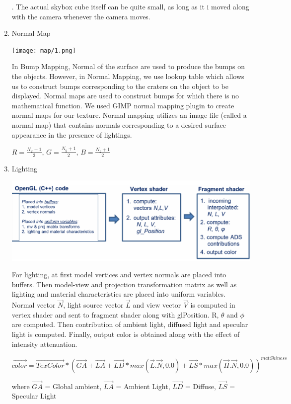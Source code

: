 \documentclass[12pt]{article}
\begin{document}
\begin{enumerate}
	. The actual skybox cube itself can be quite small, as long as it i moved along with the camera whenever the camera moves.

	
	\item Normal Map
	
	\begin{center}
	\texttt{[image: map/1.png]}
	\end{center}	
	
	In Bump Mapping, Normal of the surface are used to produce the bumps on the objects. However, in Normal Mapping, we use lookup table which allows us to construct bumps corresponding to the craters on the object to be displayed. Normal maps are used to construct bumps for which there is no mathematical function. We used GIMP normal mapping plugin to create normal maps for our texture. Normal mapping utilizes an image file (called a normal map) that contains normals corresponding to a desired surface appearance in the presence of lightings.
	
	\qquad $R = \frac{N_{x} + 1}{2}$, 
	\qquad $G = \frac{N_{y} + 1}{2}$, 
	\qquad $B = \frac{N_{z} + 1}{2}$
	
	\item Lighting	
	\begin{center}
	\includegraphics[scale = 0.5]{lighting/1.png}
	\end{center}
	
	For lighting, at first model vertices and vertex normals are placed into buffers. Then model-view and projection transformation matrix as well as lighting and material characteristics are placed into uniform variables. Normal vector $\vec{N}$, light source vector $\vec{L}$ and view vector $\vec{V}$ is computed in vertex shader and sent to fragment shader along with gl\textunderscore Position. R, $\theta$ and $\phi$ are computed. Then contribution of ambient light, diffused light and specular light is computed. Finally, output color is obtained along with the effect of intensity attenuation.
	
	\begin{center}
	$\overrightarrow{color} = \overrightarrow{TexColor} * (\overrightarrow{GA} + \overrightarrow{LA} + \overrightarrow{LD} * max(\vec{L}.\vec{N}, 0.0) + \overrightarrow{LS} * max(\vec{H}.\vec{N}, 0.0))^{matShiness}$
	\end{center}
	
	where $\vec{GA}$ = Global ambient, $\vec{LA}$ = Ambient Light, $\vec{LD}$ = Diffuse, $\vec{LS}$ = Specular Light 
	
\end{enumerate}
\end{document}
